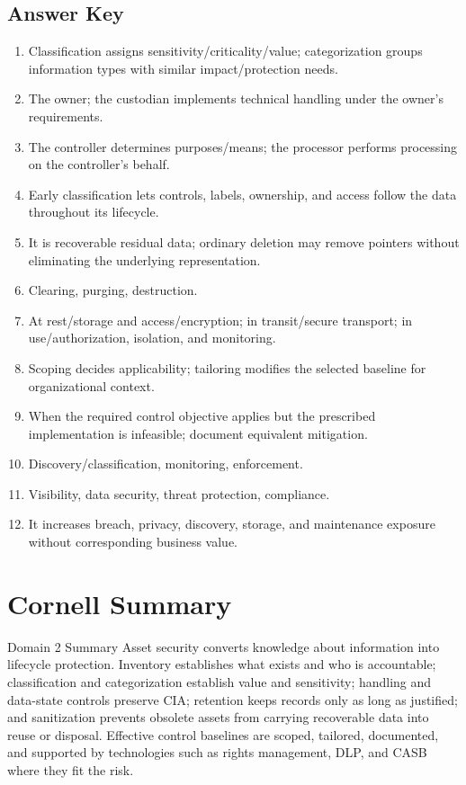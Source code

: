 \documentclass[10pt,letterpaper]{article}
\begin{document}
\subsection*{Answer Key}
\begin{enumerate}
\item Classification assigns sensitivity/criticality/value; categorization groups information types with similar impact/protection needs.
\item The owner; the custodian implements technical handling under the owner's requirements.
\item The controller determines purposes/means; the processor performs processing on the controller's behalf.
\item Early classification lets controls, labels, ownership, and access follow the data throughout its lifecycle.
\item It is recoverable residual data; ordinary deletion may remove pointers without eliminating the underlying representation.
\item Clearing, purging, destruction.
\item At rest/storage and access/encryption; in transit/secure transport; in use/authorization, isolation, and monitoring.
\item Scoping decides applicability; tailoring modifies the selected baseline for organizational context.
\item When the required control objective applies but the prescribed implementation is infeasible; document equivalent mitigation.
\item Discovery/classification, monitoring, enforcement.
\item Visibility, data security, threat protection, compliance.
\item It increases breach, privacy, discovery, storage, and maintenance exposure without corresponding business value.
\end{enumerate}

\section{Cornell Summary}
\begin{summarybox}{Domain 2 Summary}
Asset security converts knowledge about information into lifecycle protection. Inventory establishes what exists and who is accountable; classification and categorization establish value and sensitivity; handling and data-state controls preserve CIA; retention keeps records only as long as justified; and sanitization prevents obsolete assets from carrying recoverable data into reuse or disposal. Effective control baselines are scoped, tailored, documented, and supported by technologies such as rights management, DLP, and CASB where they fit the risk.
\end{summarybox}
\end{document}
